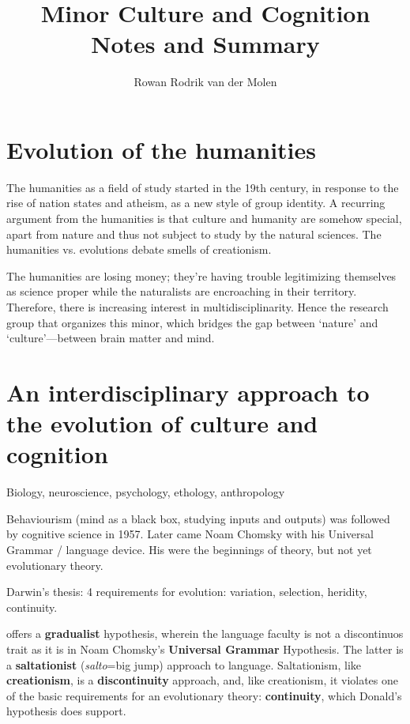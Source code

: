 \documentclass{article}
\title{Minor Culture and Cognition\\Notes and Summary}
\author{Rowan Rodrik van der Molen}
\begin{document}
\maketitle

\tableofcontents

\section{Evolution of the humanities}

The humanities as a field of study started in the 19th century, in response to the rise of nation states and atheism, as a new style of group identity.
A recurring argument from the humanities is that culture and humanity are somehow special, apart from nature and thus not subject to study by the natural sciences. The humanities vs. evolutions debate smells of creationism.

The humanities are losing money; they're having trouble legitimizing themselves as science proper while the naturalists are encroaching in their territory. Therefore, there is increasing interest in multidisciplinarity. Hence the research group that organizes this minor, which bridges the gap between ‘nature’ and ‘culture’---between brain matter and mind.



\citet{mesoudi2006}


\section{An interdisciplinary approach to the evolution of culture and cognition}

Biology, neuroscience, psychology, ethology, anthropology

Behaviourism (mind as a black box, studying inputs and outputs) was followed by cognitive science in 1957. Later came Noam Chomsky with his Universal Grammar / language device. His were the beginnings of theory, but not yet evolutionary theory.

Darwin's thesis: 4 requirements for evolution: variation, selection, heridity, continuity.

\citet{donald1991} offers a \textbf{gradualist} hypothesis, wherein the language faculty is not a discontinuos trait as it is in Noam Chomsky's \textbf{Universal Grammar} Hypothesis. The latter is a \textbf{saltationist} (\textit{salto}=big jump) approach to language. Saltationism, like \textbf{creationism}, is a \textbf{discontinuity} approach, and, like creationism, it violates one of the basic requirements for an evolutionary theory: \textbf{continuity}, which Donald's hypothesis does support.
\end{document}
